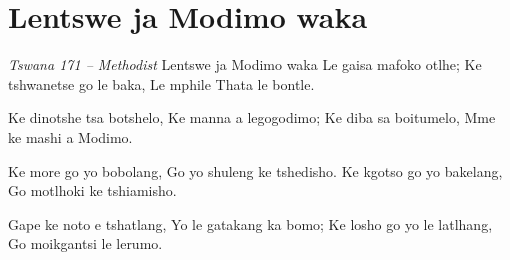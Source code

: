 \starttocol
\chapter{Lentswe ja Modimo waka}
\nexttocol
\hfill{\it Tswana 171 -- Methodist}
\stoptocol
\starttocol
\startlines
{\sc Lentswe} ja Modimo waka
Le gaisa mafoko otlhe;
Ke tshwanetse go le baka,
Le mphile Thata le bontle.

Ke dinotshe tsa botshelo,
Ke manna a legogodimo;
Ke diba sa boitumelo,
Mme ke mashi a Modimo.

Ke more go yo bobolang,
Go yo shuleng ke tshedisho.
Ke kgotso go yo bakelang,
Go motlhoki ke tshiamisho.

Gape ke noto e tshatlang,
Yo le gatakang ka bomo;
Ke losho go yo le latlhang,
Go moikgantsi le lerumo.
\stoplines
\nexttocol

\stoptocol
